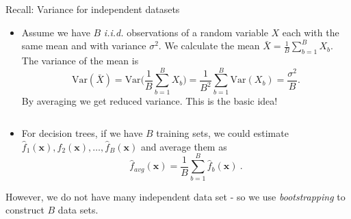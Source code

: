 \documentclass[10pt,ignorenonframetext,]{beamer}
\providecommand{\tightlist}{%
  \setlength{\itemsep}{0pt}\setlength{\parskip}{0pt}}
\begin{document}
\begin{frame}

\begin{block}{Recall: Variance for independent datasets}

\vspace{2mm}

\begin{itemize}
\tightlist
\item
  Assume we have \(B\) \emph{i.i.d.} observations of a random variable
  \(X\) each with the same mean and with variance \(\sigma^2\). We
  calculate the mean \(\bar{X} = \frac{1}{B} \sum_{b=1}^B X_b\). The
  variance of the mean is
  \[\text{Var}(\bar{X}) = \text{Var}\Big(\frac{1}{B}\sum_{b=1}^B X_b \Big) = \frac{1}{B^2} \sum_{b=1}^B \text{Var}(X_b) = \frac{\sigma^2}{B}.\]
  By averaging we get reduced variance. This is the basic idea!
\end{itemize}

\(~\)

\begin{itemize}
\tightlist
\item
  For decision trees, if we have \(B\) training sets, we could estimate
  \(\hat{f}_1({\boldsymbol x}),\hat{f}_2({\boldsymbol x}),\ldots, \hat{f}_B({\boldsymbol x})\)
  and average them as
  \[ \hat{f}_{avg}({\boldsymbol x})=\frac{1}{B}\sum_{b=1}^B \hat{f}_b({\boldsymbol x}) \ .\]
\end{itemize}

However, we do not have many independent data set - so we use
\emph{bootstrapping} to construct \(B\) data sets.

\end{block}

\end{frame}
\end{document}
